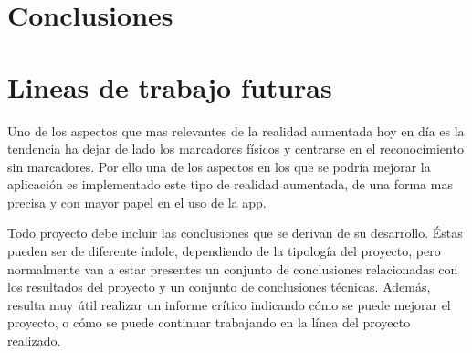 

\section{Conclusiones}

\section{Lineas de trabajo futuras}
Uno de los aspectos que mas relevantes de la realidad aumentada hoy en día es la tendencia ha dejar de lado los marcadores físicos y centrarse en el reconocimiento sin marcadores.
Por ello una de los aspectos en los que se podría mejorar la aplicación es implementado este tipo de realidad aumentada, de una forma mas precisa y con mayor papel en el uso de la app.


Todo proyecto debe incluir las conclusiones que se derivan de su desarrollo. Éstas pueden ser de diferente índole, dependiendo de la tipología del proyecto, pero normalmente van a estar presentes un conjunto de conclusiones relacionadas con los resultados del proyecto y un conjunto de conclusiones técnicas. 
Además, resulta muy útil realizar un informe crítico indicando cómo se puede mejorar el proyecto, o cómo se puede continuar trabajando en la línea del proyecto realizado. 
